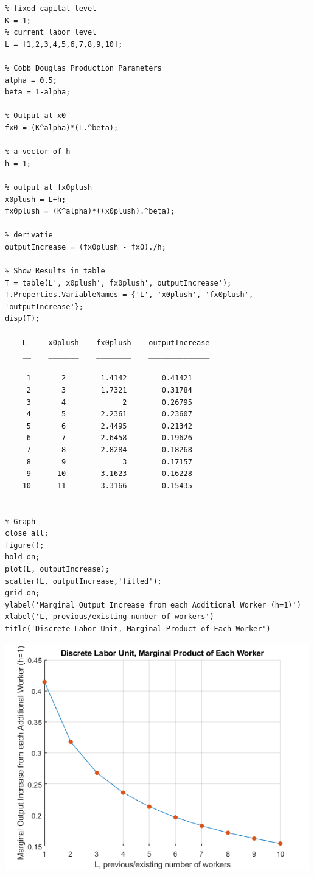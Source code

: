 \documentclass[
]{book}
\begin{document}
\begin{verbatim}
% fixed capital level
K = 1;
% current labor level
L = [1,2,3,4,5,6,7,8,9,10];

% Cobb Douglas Production Parameters
alpha = 0.5;
beta = 1-alpha;

% Output at x0
fx0 = (K^alpha)*(L.^beta);

% a vector of h
h = 1;

% output at fx0plush
x0plush = L+h;
fx0plush = (K^alpha)*((x0plush).^beta);

% derivatie 
outputIncrease = (fx0plush - fx0)./h;

% Show Results in table
T = table(L', x0plush', fx0plush', outputIncrease');
T.Properties.VariableNames = {'L', 'x0plush', 'fx0plush', 'outputIncrease'};
disp(T);

    L     x0plush    fx0plush    outputIncrease
    __    _______    ________    ______________

     1       2        1.4142        0.41421    
     2       3        1.7321        0.31784    
     3       4             2        0.26795    
     4       5        2.2361        0.23607    
     5       6        2.4495        0.21342    
     6       7        2.6458        0.19626    
     7       8        2.8284        0.18268    
     8       9             3        0.17157    
     9      10        3.1623        0.16228    
    10      11        3.3166        0.15435    


% Graph
close all;
figure();
hold on;
plot(L, outputIncrease);
scatter(L, outputIncrease,'filled');
grid on;
ylabel('Marginal Output Increase from each Additional Worker (h=1)')
xlabel('L, previous/existing number of workers')
title('Discrete Labor Unit, Marginal Product of Each Worker')
\end{verbatim}

\includegraphics[width=5.20833in,height=\textheight]{img/derivative_MPL_discrete_workers_images/figure_0.png}
\end{document}
